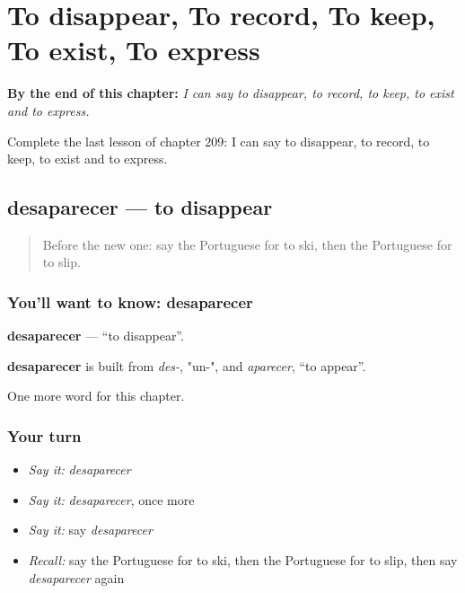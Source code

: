 
\chapter{To disappear, To record, To keep, To exist, To express}
\label{ch:pt-to-disappear-to-record-to-keep-to-exist-to-express}

\begin{chapteropening}
\textbf{By the end of this chapter:} \emph{I can say to disappear, to record, to keep, to exist and to express.}

Complete the last lesson of chapter 209: I can say to disappear, to record, to keep, to exist and to express.
\end{chapteropening}

\section[desaparecer]{desaparecer — to disappear}

\label{lesson:PT-C209-desaparecer}



\begin{quote}
Before the new one: say the Portuguese for to ski, then the Portuguese for to slip.
\end{quote}

\subsection*{You'll want to know: desaparecer}
\textbf{desaparecer} — \textquotedblleft{}to disappear\textquotedblright{}.

\begin{cousinweb}
\textbf{desaparecer} is built from \emph{des-}, "un-", and \emph{aparecer}, \textquotedblleft{}to appear\textquotedblright{}.
\end{cousinweb}

\begin{grammarlens}[title={What you've built}]
One more word for this chapter.
\end{grammarlens}

\subsection*{Your turn}
\begin{itemize}
\raggedright
  \item \emph{Say it:} \emph{desaparecer}
  \item \emph{Say it:} \emph{desaparecer}, once more
  \item \emph{Say it:} say \emph{desaparecer}
  \item \emph{Recall:} say the Portuguese for to ski, then the Portuguese for to slip, then say \emph{desaparecer} again
\end{itemize}

